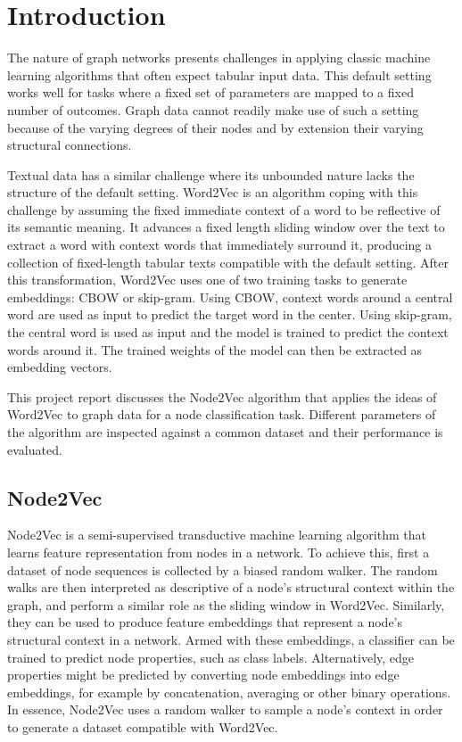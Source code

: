 \documentclass[a4paper,10pt]{article}
\begin{document}



\tableofcontents
\newpage

\section{Introduction}

The nature of graph networks presents challenges in applying classic machine learning algorithms that often expect tabular input data. This default setting works well for tasks where a fixed set of parameters are mapped to a fixed number of outcomes. Graph data cannot readily make use of such a setting because of the varying degrees of their nodes and by extension their varying structural connections.

Textual data has a similar challenge where its unbounded nature lacks the structure of the default setting. Word2Vec is an algorithm coping with this challenge by assuming the fixed immediate context of a word to be reflective of its semantic meaning. It advances a fixed length sliding window over the text to extract a word with context words that immediately surround it, producing a collection of fixed-length tabular texts compatible with the default setting. After this transformation, Word2Vec uses one of two training tasks to generate embeddings: CBOW or skip-gram. Using CBOW, context words around a central word are used as input to predict the target word in the center. Using skip-gram, the central word is used as input and the model is trained to predict the context words around it. The trained weights of the model can then be extracted as embedding vectors.

This project report discusses the Node2Vec algorithm that applies the ideas of Word2Vec to graph data for a node classification task. Different parameters of the algorithm are inspected against a common dataset and their performance is evaluated.

\subsection{Node2Vec}

Node2Vec is a semi-supervised transductive machine learning algorithm that learns feature representation from nodes in a network. To achieve this, first a dataset of node sequences is collected by a biased random walker. The random walks are then interpreted as descriptive of a node's structural context within the graph, and perform a similar role as the sliding window in Word2Vec. Similarly, they can be used to produce feature embeddings that represent a node’s structural context in a network. Armed with these embeddings, a classifier can be trained to predict node properties, such as class labels. Alternatively, edge properties might be predicted by converting node embeddings into edge embeddings, for example by concatenation, averaging or other binary operations. In essence, Node2Vec uses a random walker to sample a node's context in order to generate a dataset compatible with Word2Vec.
\end{document}
